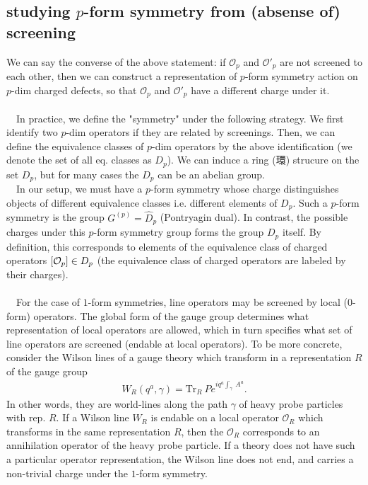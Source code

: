 \documentclass{ltjsarticle}
\theoremstyle{mystyle} %
\numberwithin{equation}{section}
\begin{document}
\subsection{studying $p$-form symmetry from (absense of) screening}
We can say the converse of the above statement: 
if $\mathcal{O}_p$ and $\mathcal{O}'_p$ are not screened to each other, 
then we can construct a representation of $p$-form symmetry action on $p$-dim charged defects,  
so that $\mathcal{O}_p$ and $\mathcal{O}'_p$ have a different charge under it. \\\\
　In practice, we define the "symmetry" under the following strategy. 
We first identify two $p$-dim operators if they are related by screenings. 
Then, we can define the equivalence classes of $p$-dim operators by the above identification (we denote the set of all eq. classes as $D_{p}$). 
We can induce a ring (環) strucure on the set $D_p$, but for many cases the $D_p$ can be an abelian group. \\
　In our setup, we must have a $p$-form symmetry whose charge distinguishes 
objects of different equivalence classes i.e. different elements of $D_p$. 
Such a $p$-form symmetry is the group $G^{(p)}=\hat{D}_p$ (Pontryagin dual). 
In contrast, the possible charges under this $p$-form symmetry group forms the group $D_p$ itself. 
By definition, this corresponds to elements of the equivalence class of charged operators $\left[{\mathcal{O}_p}\right]\in D_p$ 
(the equivalence class of charged operators are labeled by their charges). \\\\
　For the case of $1$-form symmetries, line operators may be screened by local (0-form) operators. 
The global form of the gauge group determines what representation of local operators are allowed, 
which in turn specifies what set of line operators are screened (endable at local operators). 
To be more concrete, consider the Wilson lines of a gauge theory 
which transform in a representation $R$ of the gauge group
\begin{align}
    W_R(q^a, \gamma) = \mathrm{Tr}_{R}~Pe^{iq^a\int_\gamma ~A^a}. 
\end{align}
In other words, they are world-lines along the path $\gamma$ of heavy probe particles with rep. $R$. 
If a Wilson line $W_R$ is endable on a local operator $\mathcal{O}_R$ which transforms in the same representation $R$, 
then the $\mathcal{O}_R$ corresponds to an annihilation operator of the heavy probe particle. 
If a theory does not have such a particular operator representation, 
the Wilson line does not end, and carries a non-trivial charge under the $1$-form symmetry. 
\end{document}
